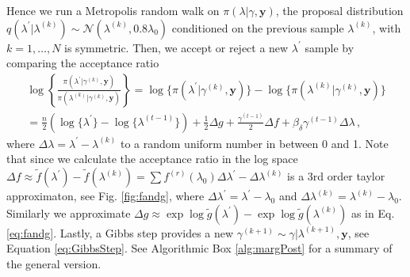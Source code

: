 Hence we run a Metropolis random walk on $\pi(\lambda | \gamma, \bm{y})$, the proposal distribution $q(\lambda^\prime|\lambda^{(k)}) \sim \mathcal{N}(\lambda^{(k)}, 0.8 \lambda_{0})$ conditioned on the previous sample $\lambda^{(k)}$, with $k = 1 , \dots, N$ is symmetric.
Then, we accept or reject a new $\lambda^{\prime}$ sample by comparing the acceptance ratio
\begin{align} 
	\log \left\{ \frac{\pi(\lambda^{\prime} | \gamma^{(k)}, \bm{y})  }{\pi(\lambda^{(k)}| \gamma^{(k)}, \bm{y})}  \right\} 
	= \log  \{\pi(\lambda^{\prime} | \gamma^{(k)}, \bm{y} ) \}  -\log  \{ \pi(\lambda^{(k)}| \gamma^{(k)}, \bm{y}) \} \\
	= \frac{n}{2} (\log\{\lambda^{\prime}\} - \log\{\lambda^{(t-1)}\} ) + \frac{1}{2} \Delta g + \frac{\gamma^{(t-1)}}{2} \Delta f  + \beta_\delta \gamma^{(t-1)} \Delta \lambda  \, ,
\end{align}
where $\Delta \lambda = \lambda^{\prime} - \lambda^{(k)} $ to a random uniform number in between 0 and 1.
Note that since we calculate the acceptance ratio in the log space $\Delta f \approx \tilde{f}(\lambda^\prime) - \tilde{f}(\lambda^{(k)}) = \sum f^{(r)} (\lambda_0)\Delta \lambda^\prime - \Delta \lambda^{(k)} $ is a 3rd order taylor approximaton, see Fig. \ref{fig:fandg}, where $\Delta \lambda^{\prime} = \lambda^\prime - \lambda_0 $ and $\Delta \lambda^{(k)} =  \lambda^{(k)} - \lambda_0$.
Similarly we approximate $\Delta g \approx \exp{\log{\tilde{g}(\lambda^{\prime})}} - \exp{\log{\tilde{g}(\lambda^{(k)})}}$ as in Eq. \ref{eq:fandg}.
Lastly, a Gibbs step provides a new $\gamma^{(k+1)} \sim \gamma | \lambda^{(k+1)}, \bm{y}$, see Equation \eqref{eq:GibbsStep}.
See Algorithmic Box \ref{alg:margPost} for a summary of the general version.

